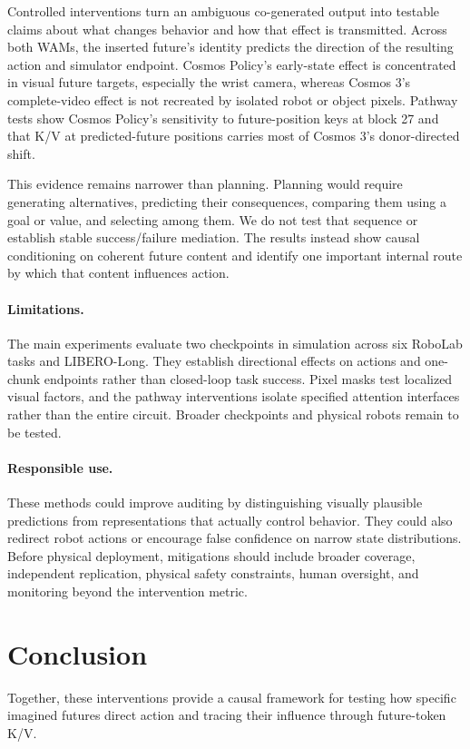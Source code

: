Controlled interventions turn an ambiguous co-generated output into testable claims about what changes behavior and how that effect is transmitted. Across both WAMs, the inserted future's identity predicts the direction of the resulting action and simulator endpoint. Cosmos Policy's early-state effect is concentrated in visual future targets, especially the wrist camera, whereas Cosmos 3's complete-video effect is not recreated by isolated robot or object pixels. Pathway tests show Cosmos Policy's sensitivity to future-position keys at block 27 and that K/V at predicted-future positions carries most of Cosmos 3's donor-directed shift.

This evidence remains narrower than planning. Planning would require generating alternatives, predicting their consequences, comparing them using a goal or value, and selecting among them. We do not test that sequence or establish stable success/failure mediation. The results instead show causal conditioning on coherent future content and identify one important internal route by which that content influences action.

\paragraph{Limitations.}
The main experiments evaluate two checkpoints in simulation across six RoboLab tasks and LIBERO-Long. They establish directional effects on actions and one-chunk endpoints rather than closed-loop task success. Pixel masks test localized visual factors, and the pathway interventions isolate specified attention interfaces rather than the entire circuit. Broader checkpoints and physical robots remain to be tested.

\paragraph{Responsible use.}
These methods could improve auditing by distinguishing visually plausible predictions from representations that actually control behavior. They could also redirect robot actions or encourage false confidence on narrow state distributions. Before physical deployment, mitigations should include broader coverage, independent replication, physical safety constraints, human oversight, and monitoring beyond the intervention metric.

\section{Conclusion}

Together, these interventions provide a causal framework for testing how specific imagined futures direct action and tracing their influence through future-token K/V.
